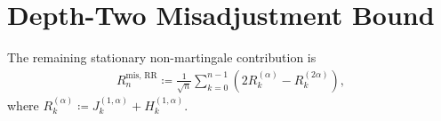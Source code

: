 
\section{Depth-Two Misadjustment Bound}

The remaining stationary non-martingale contribution is
\begin{equation}
\begin{aligned}
R_n^{\text{mis, RR}} \coloneqq \frac{1}{\sqrt{n}} \sum_{k = 0}^{n - 1}
                    (2 R_k^{(\alpha)} - R_k^{(2 \alpha)}),
\end{aligned}
\label{eq:R-mis-def}
\end{equation}
where \(R_k^{(\alpha)} \coloneqq J_k^{(1, \alpha)} + H_k^{(1, \alpha)}\).

